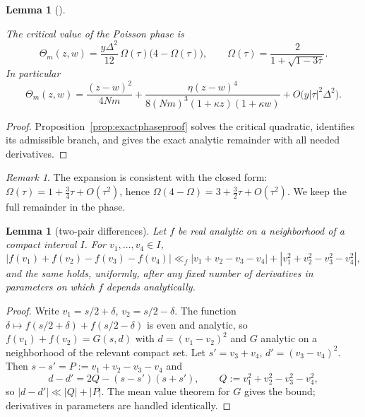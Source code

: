\documentclass[11pt]{amsart}
\newtheorem{lemma}[theorem]{Lemma}
\theoremstyle{definition}
\theoremstyle{remark}
\newtheorem{remark}[theorem]{Remark}
\numberwithin{equation}{section}
\begin{document}
\begin{lemma}[{\cite[(3.10)--(3.12)]{B38}}]\label{lem:phase}

The critical value of the Poisson phase is
\[
\Theta_m(z,w)=\frac{y\Delta^2}{12}\,\Omega(\tau)\big(4-\Omega(\tau)\big),\qquad
\Omega(\tau)=\frac2{1+\sqrt{1-3\tau}} .
\]
In particular
\[
\Theta_m(z,w)=\frac{(z-w)^2}{4Nm}+\frac{\eta(z-w)^4}{8(Nm)^3(1+\kappa z)(1+\kappa w)}+O\big(y|\tau|^2\Delta^2\big).
\]
\end{lemma}
\begin{proof}
Proposition~\ref{prop:exactphaseproof} solves the critical quadratic, identifies its admissible branch, and gives the exact analytic remainder with all needed derivatives.
\end{proof}

\begin{remark}
The expansion is consistent with the closed form: $\Omega(\tau)=1+\frac34\tau+O(\tau^2)$, hence $\Omega(4-\Omega)=3+\frac32\tau+O(\tau^2)$. We keep the full remainder in the phase.
\end{remark}

\begin{lemma}[two-pair differences]\label{lem:twopair}
Let $f$ be real analytic on a neighborhood of a compact interval $I$. For $v_1,\dots,v_4\in I$,
\[
|f(v_1)+f(v_2)-f(v_3)-f(v_4)|\ll_f|v_1+v_2-v_3-v_4|+|v_1^2+v_2^2-v_3^2-v_4^2|,
\]
and the same holds, uniformly, after any fixed number of derivatives in parameters on which $f$ depends analytically.
\end{lemma}

\begin{proof}
Write $v_1=s/2+\delta$, $v_2=s/2-\delta$. The function $\delta\mapsto f(s/2+\delta)+f(s/2-\delta)$ is even and analytic, so $f(v_1)+f(v_2)=G(s,d)$ with $d=(v_1-v_2)^2$ and $G$ analytic on a neighborhood of the relevant compact set. Let $s'=v_3+v_4$, $d'=(v_3-v_4)^2$. Then $s-s'=P:=v_1+v_2-v_3-v_4$ and
\[
d-d'=2Q-(s-s')(s+s'),\qquad Q:=v_1^2+v_2^2-v_3^2-v_4^2,
\]
so $|d-d'|\ll|Q|+|P|$. The mean value theorem for $G$ gives the bound; derivatives in parameters are handled identically.
\end{proof}
\end{document}
